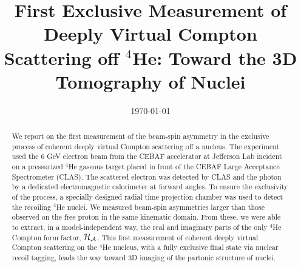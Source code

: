 \documentclass[twocolumn,nofootinbib,showpacs,prl,superscriptaddress,secnumarabic,amssymb,nobibnotes,aps,floatfix]{revtex4}
\begin{document}
\title{First Exclusive Measurement of Deeply Virtual Compton Scattering off $^4$He: Toward the 3D Tomography of Nuclei}


%
\date{\today}
\begin{abstract}
We report on the first measurement of the beam-spin asymmetry in the exclusive 
process of coherent deeply virtual Compton scattering off a nucleus. The 
experiment used the 6 GeV electron beam from the CEBAF accelerator at Jefferson 
Lab incident on a pressurized $^4$He gaseous target placed in front of the CEBAF Large Acceptance 
Spectrometer (CLAS). The scattered electron was detected by CLAS and the photon 
by a dedicated electromagnetic calorimeter at forward angles. To ensure the 
exclusivity of the process, a specially designed radial time projection chamber 
was used to detect the recoiling $^4$He nuclei. We measured beam-spin 
asymmetries larger than those observed on the free proton in the same kinematic 
domain. From these, we were able to extract, in a model-independent way, the 
real and imaginary parts of the only $^4$He Compton form factor, $\cal H_A$. 
This first measurement of coherent deeply virtual Compton scattering on 
the $^4$He nucleus, with a fully exclusive final state via nuclear recoil 
tagging, leads the way toward 3D imaging of the partonic structure of nuclei.
\end{abstract}

\maketitle 
\end{document}
